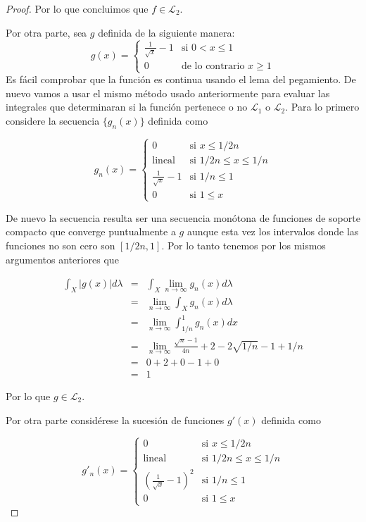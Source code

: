 \documentclass[letter,twoside,12pt]{article}
\numberwithin{equation}{section}
\begin{document}
\begin{enumerate}[label = (\textbf{\arabic*.})]
\begin{proof}
Por lo que concluimos que $f \in \mathcal{L}_2$.

Por otra parte, sea $g$ definida de la siguiente manera:
\begin{equation}
g(x) = \left\{
	\begin{array}{ll}
		\frac{1}{\sqrt{x}}-1  & \mbox{si } 0 < x \leq 1 
		 \\ 0 & \mbox{de lo contrario } x \geq 1
	\end{array}
\right.
\end{equation}
Es fácil comprobar que la función es continua usando el lema del pegamiento. De nuevo vamos a usar el mismo método usado anteriormente para evaluar las integrales que determinaran si la función pertenece o no $ \mathcal{L}_1 $ o $ \mathcal{L}_2 $. Para lo primero considere la secuencia $\{g_n(x)\} $ definida como

\begin{equation}
g_n(x) = \left\{
	\begin{array}{ll}
		0 & \mbox{si } x \leq 1/2n
		\\\mbox{lineal} & \mbox{si } 1/2n \leq x \leq 1/n
		\\\frac{1}{\sqrt{x}}-1 & \mbox{si } 1/n \leq 1 
		\\0 & \mbox{si } 1 \leq x
	\end{array}
\right.
\end{equation}

De nuevo la secuencia resulta ser una secuencia monótona de funciones de soporte compacto que converge puntualmente a $ g $ aunque esta vez los intervalos donde las funciones no son cero son $ [1/2n,1] $. Por lo tanto tenemos por los mismos argumentos anteriores que

\begin{eqnarray*}
 \int_X |g(x)|d\lambda &=& \int_X \lim_{n \to \infty} g_n(x)d\lambda
 \\&=&\lim_{n \to \infty} \int_X g_n(x)d\lambda 
 \\&=& \lim_{n \to \infty} \int_{1/n}^1 g_n(x)dx
 \\&=& \lim_{n \to \infty} \frac{\sqrt{n}-1}{4n} +2-2\sqrt{1/n}-1+1/n
 \\&=& 0 +2 +0- 1 + 0
  \\&=& 1
\end{eqnarray*}

Por lo que $ g \in \mathcal{L}_2 $.

Por otra parte considérese la sucesión de funciones $g'(x) $ definida como

\begin{equation}
g'_n(x) = \left\{
	\begin{array}{ll}
		0 & \mbox{si } x \leq 1/2n
		\\\mbox{lineal} & \mbox{si } 1/2n \leq x \leq 1/n
		\\(\frac{1}{\sqrt{x}}-1)^2 & \mbox{si } 1/n \leq 1 
		\\0 & \mbox{si } 1 \leq x
	\end{array}
\right.
\end{equation}


\end{proof}
\end{enumerate}
\end{document}
